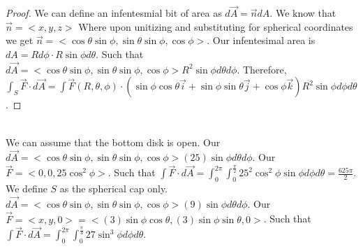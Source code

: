 \documentclass{article}
\begin{document}
\begin{proof}
  We can define an infentesmial bit of area as $d\vec{A} = \vec{n} dA$.
  We know that $\vec{n} = <x,y,z>$ Where upon unitizing and substituting for spherical coordinates
  we get $\vec{n} = <\cos \theta \sin \phi, \sin \theta \sin \phi, \cos \phi>$.
  Our infentesimal area is $dA = R d\phi \cdot R \sin \phi d\theta$. Such that $d\vec{A} = <\cos \theta \sin \phi, \sin \theta \sin \phi, \cos \phi> R^2 \sin \phi d\theta d\phi$.
  Therefore, $\int_S \vec{F} \cdot d\vec{A} = \int \vec{F}(R, \theta, \phi) \cdot(\sin \phi \cos \theta \vec{i}+\sin \phi \sin \theta \vec{j}+\cos \phi \vec{k}) R^2 \sin \phi d \phi d \theta$.
\end{proof}
\sol \\
We can assume that the bottom disk is open.
Our $d\vec{A} = <\cos \theta \sin \phi, \sin \theta \sin \phi, \cos \phi> (25) \sin \phi d\theta d\phi$.
Our $\vec{F} = <0,0,25\cos^2 \phi>$. Such that $\int \vec{F} \cdot d\vec{A} = \int_0^{2\pi} \int_0^{\frac{\pi}{2}} 25^2 \cos^2 \phi \sin \phi d\phi d\theta = \frac{625\pi}{2}$.
\sol \\
We define $S$ as the spherical cap only. $d\vec{A} = <\cos \theta \sin \phi, \sin \theta \sin \phi, \cos \phi> (9) \sin \phi d\theta d\phi$.
Our $\vec{F} = <x,y,0>=<(3) \sin \phi \cos \theta, (3) \sin \phi \sin \theta ,0>$. Such that $\int \vec{F} \cdot d\vec{A} = \int_0^{2\pi} \int_0^{\frac{\pi}{4}} 27 \sin^3 \phi d\phi d\theta$.
\end{document}
